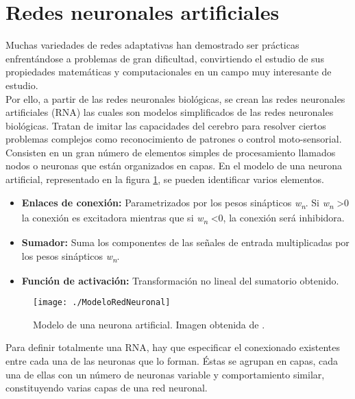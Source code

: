 \documentclass[a4paper, 12pt, spanish, chapterprefix, numbers=noenddot]{book}
\begin{document}
\section{Redes neuronales artificiales}

Muchas variedades de redes adaptativas han demostrado ser prácticas enfrentándose a problemas de gran dificultad, convirtiendo el estudio de sus propiedades matemáticas y computacionales en un campo muy interesante de estudio.\\

Por ello, a partir de las redes neuronales biológicas, se crean las redes neuronales artificiales (RNA) las cuales son modelos simplificados de las redes neuronales biológicas. Tratan de imitar las capacidades del cerebro para resolver ciertos problemas complejos como reconocimiento de patrones o control moto-sensorial.\\

Consisten en un gran número de elementos simples de procesamiento llamados nodos o neuronas que están organizados en capas. En el modelo de una neurona artificial, representado en la figura \ref{ModeloRedNeuronal}, se pueden identificar varios elementos\cite{RNN}.

\begin{itemize}
\item \textbf{Enlaces de conexión:} Parametrizados por los pesos sinápticos \textit{w\textsubscript{n}}. Si \textit{w\textsubscript{n}} \textgreater 0 la conexión es excitadora mientras que si \textit{w\textsubscript{n}} \textless 0, la conexión será inhibidora.
\item \textbf{Sumador:} Suma los componentes de las señales de entrada multiplicadas por los pesos sinápticos \textit{w\textsubscript{n}}.
\item \textbf{Función de activación:}  Transformación no lineal del sumatorio obtenido.
\end{itemize}

\begin{figure}[H]
\begin{center}
\texttt{[image: ./ModeloRedNeuronal]}
\caption{Modelo de una neurona artificial. Imagen obtenida de \cite{NeuronaModelo}.}
\label{ModeloRedNeuronal}
\end{center}
\end{figure}

Para definir totalmente una RNA, hay que especificar el conexionado existentes entre cada una de las neuronas que lo forman. Éstas se agrupan en capas, cada una de ellas con un número de neuronas variable y comportamiento similar, constituyendo varias capas de una red neuronal.\\
\end{document}

